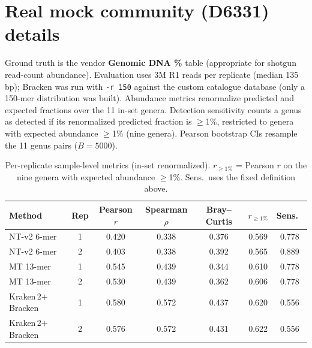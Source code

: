 \documentclass[11pt]{article}
\begin{document}
\section{Real mock community (D6331) details}
\label{sec:supp-mock}

Ground truth is the vendor \textbf{Genomic DNA \%} table (appropriate for
shotgun read-count abundance). Evaluation uses 3M R1 reads per replicate
(median 135\,bp); Bracken was run with \texttt{-r 150} against the custom
catalogue database (only a 150-mer distribution was built). Abundance metrics
renormalize predicted and expected fractions over the 11 in-set genera.
Detection sensitivity counts a genus as detected if its renormalized predicted
fraction is $\ge$1\%, restricted to genera with expected abundance $\ge$1\%
(nine genera). Pearson bootstrap CIs resample the 11 genus pairs ($B{=}5000$).

\begin{table}[h]
\centering
\caption{Per-replicate sample-level metrics (in-set renormalized).
$r_{\ge1\%}$ = Pearson $r$ on the nine genera with expected abundance
$\ge$1\%. Sens.\ uses the fixed definition above.}
\small
\begin{tabularx}{\linewidth}{@{}lcccccc@{}}
\toprule
Method & Rep & Pearson $r$ & Spearman $\rho$ & Bray--Curtis & $r_{\ge1\%}$ & Sens.\ \\
\midrule
NT-v2 6-mer & 1 & 0.420 & 0.338 & 0.376 & 0.569 & 0.778 \\
NT-v2 6-mer & 2 & 0.403 & 0.338 & 0.392 & 0.565 & 0.889 \\
MT 13-mer   & 1 & 0.545 & 0.439 & 0.344 & 0.610 & 0.778 \\
MT 13-mer   & 2 & 0.530 & 0.439 & 0.362 & 0.606 & 0.778 \\
Kraken\,2$+$Bracken & 1 & 0.580 & 0.572 & 0.437 & 0.620 & 0.556 \\
Kraken\,2$+$Bracken & 2 & 0.576 & 0.572 & 0.431 & 0.622 & 0.556 \\
\bottomrule
\end{tabularx}
\end{table}
\end{document}
